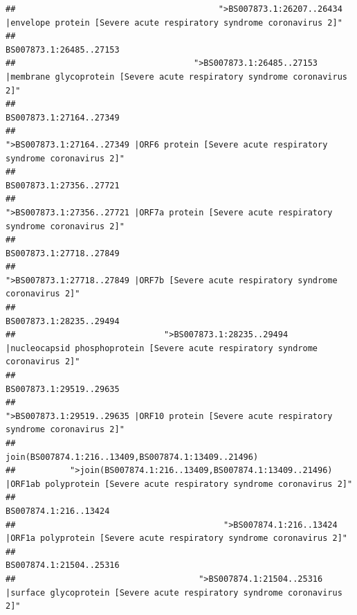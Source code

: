 \documentclass[
]{article}
\begin{document}
\begin{verbatim}
##                                         ">BS007873.1:26207..26434 |envelope protein [Severe acute respiratory syndrome coronavirus 2]" 
##                                                                                                                BS007873.1:26485..27153 
##                                    ">BS007873.1:26485..27153 |membrane glycoprotein [Severe acute respiratory syndrome coronavirus 2]" 
##                                                                                                                BS007873.1:27164..27349 
##                                             ">BS007873.1:27164..27349 |ORF6 protein [Severe acute respiratory syndrome coronavirus 2]" 
##                                                                                                                BS007873.1:27356..27721 
##                                            ">BS007873.1:27356..27721 |ORF7a protein [Severe acute respiratory syndrome coronavirus 2]" 
##                                                                                                                BS007873.1:27718..27849 
##                                                    ">BS007873.1:27718..27849 |ORF7b [Severe acute respiratory syndrome coronavirus 2]" 
##                                                                                                                BS007873.1:28235..29494 
##                              ">BS007873.1:28235..29494 |nucleocapsid phosphoprotein [Severe acute respiratory syndrome coronavirus 2]" 
##                                                                                                                BS007873.1:29519..29635 
##                                            ">BS007873.1:29519..29635 |ORF10 protein [Severe acute respiratory syndrome coronavirus 2]" 
##                                                                                    join(BS007874.1:216..13409,BS007874.1:13409..21496) 
##           ">join(BS007874.1:216..13409,BS007874.1:13409..21496) |ORF1ab polyprotein [Severe acute respiratory syndrome coronavirus 2]" 
##                                                                                                                  BS007874.1:216..13424 
##                                          ">BS007874.1:216..13424 |ORF1a polyprotein [Severe acute respiratory syndrome coronavirus 2]" 
##                                                                                                                BS007874.1:21504..25316 
##                                     ">BS007874.1:21504..25316 |surface glycoprotein [Severe acute respiratory syndrome coronavirus 2]" 

\end{verbatim}
\end{document}
